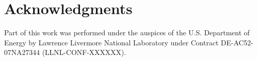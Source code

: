 \section{Acknowledgments}
Part of this work was performed under the auspices of the
U.S. Department of Energy by Lawrence Livermore National Laboratory
under Contract DE-AC52-07NA27344 (LLNL-CONF-XXXXXX).



